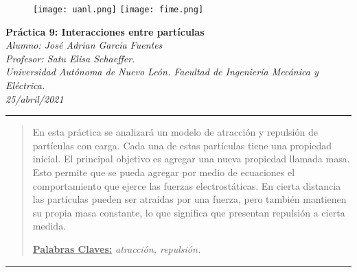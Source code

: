 \documentclass[10pt,a4paper]{article}
\author{Jorge Vicente Niño Mocarro}
\begin{document}
	
	\begin{figure}[H]
		\raggedright
		\texttt{[image: uanl.png]} \hfill \texttt{[image: fime.png]}
	\end{figure}

	\vspace{6mm}
	
	\begin{center}
		{\Large \textbf{Práctica 9: Interacciones entre partículas}}\\
		\vspace{2mm}
		\textit{ Alumno: José Adrian Garcia Fuentes}\\
		\textit{Profesor: Satu Elisa Schaeffer.}\\
		\vspace{2.5mm}
		\textit{Universidad Autónoma de Nuevo León. Facultad de Ingeniería Mecánica y Eléctrica.}\\
		\vspace{1mm}
		\textit {25/abril/2021 }
		
		
	\end{center}

	\begin{center}
		\textcolor{azul}{\rule{150mm}{0.8mm}}
	\end{center}

	\begin{abstract}
		En esta práctica se analizará un modelo de atracción y repulsión de partículas con carga. Cada una de estas partículas tiene una propiedad inicial. El principal objetivo es agregar una nueva propiedad llamada masa. Esto permite que se pueda agregar por medio de ecuaciones el comportamiento que ejerce las fuerzas electrostáticas. En cierta distancia las partículas pueden ser atraídas por una fuerza, pero también mantienen su propia masa constante, lo que significa que presentan repulsión a cierta medida.
		\vspace{2mm}\par
		\underline{\textbf{Palabras Claves:}} \hspace{2mm} \textit{atracción, repulsión.}
	\end{abstract}
	
	\begin{center}
		\textcolor{azul}{\rule{150mm}{0.8mm}}
	\end{center}
	
\end{document}
